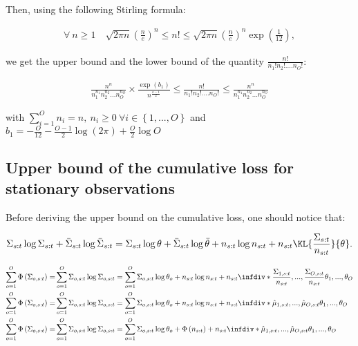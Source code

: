 \documentclass{article} %
\begin{document}
Then, using the following Stirling formula:

	\begin{align*}
\forall \ n\geq 1 \quad	\sqrt{2\pi n} \left(\frac{n}{e} \right)^n  \leq n!  \leq \sqrt{2\pi n} \left(\frac{n}{e} \right)^n \exp \left(\frac{1}{12} \right),
	\end{align*}


we get the upper bound and the lower bound of the quantity $\frac{n!}{n_1! n_2! .... n_O!}$:

\begin{align}
 \frac{n^n}{n_1^{n_1}  n_2^{n_2} ... n_O^{n_O}} \times \frac{\exp(b_1) }{n^{\frac{o-1}{2}}}  \leq  \frac{n!}{n_1! n_2! .... n_O!} \leq \frac{n^n}{n_1^{n_1}  n_2^{n_2} ... n_O^{n_O}} \label{Eq:CombStirling}
\end{align}

with $\sum_{i=1}^{O} n_i = n, \ n_i \geq 0 \ \forall i \in \left\lbrace 1, ..., O \right\rbrace $ and  $b_1 = -\frac{O}{12}- \frac{O-1}{2} \log \left(2\pi \right) + \frac{O}{2} \log O$



\subsection{Upper bound of the cumulative loss for stationary observations}

Before deriving the upper bound on the cumulative loss, one should notice that:

	\begin{align}
	\Sigma_{s:t} \log \Sigma_{s:t} + \bar{\Sigma}_{s:t} \log \bar{\Sigma}_{s:t} =  \Sigma_{s:t} \log \theta + \bar{\Sigma}_{s:t} \log  \bar{\theta} + n_{s:t}\log n_{s:t}  +  n_{s:t} \KL{\frac{\Sigma_{s:t}}{n_{s:t}}}{\theta}.
	\end{align}

	\begin{align}
	\sum_{o=1}^{O} \Phi \left( \Sigma_{o,s:t} \right) = &\sum_{o=1}^O  \Sigma_{o,s:t} \log \Sigma_{o,s:t}  = \sum_{o=1}^O  \Sigma_{o,s:t} \log \theta_o + n_{s:t}\log n_{s:t}  + n_{s:t} \infdiv*{\frac{\Sigma_{1,s:t}}{n_{s:t}},...,\frac{\Sigma_{O,s:t}}{n_{s:t}}}{\theta_1,...,\theta_O} \\
\sum_{o=1}^{O} \Phi \left( \Sigma_{o,s:t} \right)= & \sum_{o=1}^O  \Sigma_{o,s:t} \log \Sigma_{o,s:t}  = \sum_{o=1}^O  \Sigma_{o,s:t} \log \theta_o + n_{s:t}\log n_{s:t}  +  n_{s:t}\infdiv*{\hat{\mu}_{1,s:t}, ..., \hat{\mu}_{O,s:t}}{\theta_1,...,\theta_O} \\
\sum_{o=1}^{O} \Phi \left( \Sigma_{o,s:t} \right)= & \sum_{o=1}^O  \Sigma_{o,s:t} \log \Sigma_{o,s:t}  = \sum_{o=1}^O  \Sigma_{o,s:t} \log \theta_o + \Phi \left( n_{s:t} \right)  + n_{s:t} \infdiv*{\hat{\mu}_{1,s:t}, ..., \hat{\mu}_{O,s:t}}{\theta_1,...,\theta_O}
\label{Eq11}
 \end{align}
\end{document}
